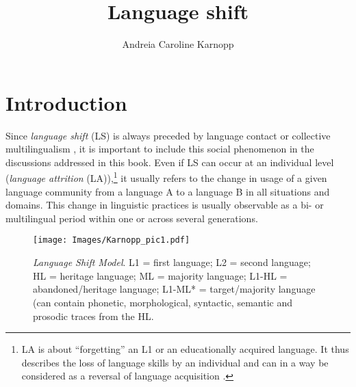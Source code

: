 \documentclass[output=paper]{langscibook}
\title{Language shift}
\author{Andreia Caroline Karnopp\affiliation{University of Zurich}}
\begin{document}
\maketitle
\label{chap_shift}

\section{Introduction}

Since \emph{language shift} (LS) is always preceded by language contact or collective multilingualism \parencite[320]{Ostler2011}, it is important to include this social phenomenon in the discussions addressed in this book. Even if LS can occur at an individual level (\emph{language attrition} (LA)),\footnote{LA is about ``forgetting'' an L1 or an educationally acquired language. It thus describes the loss of language skills by an individual and can in a way be considered as a reversal of language acquisition \parencite{Lambert1982}.} it usually refers to the change in usage of a given language community from a language A to a language B in all situations and domains. This change in linguistic practices is usually observable as a bi- or multilingual period within one or across several generations.


\begin{figure}[b]
\texttt{[image: Images/Karnopp\_pic1.pdf]}
\caption{\emph{Language Shift Model}. L1 = first
  language; L2 = second language; HL = heritage language; ML = majority
  language; L1-HL = abandoned/heritage language; L1-ML* =
  target/majority language (can contain phonetic, morphological,
  syntactic, semantic and prosodic traces from the HL.}
\label{fig:shift:figure1}
\end{figure}
\end{document}
